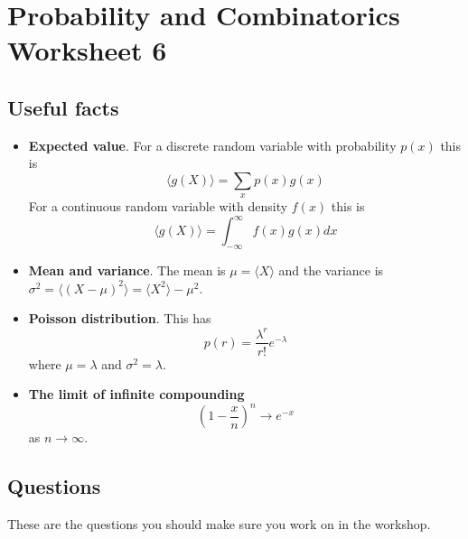 \documentclass[11pt,a4paper]{scrartcl}
\begin{document}
\section*{Probability and Combinatorics Worksheet 6}

\subsection*{Useful facts}

\begin{itemize}

\item \textbf{Expected value}. For a discrete random variable with probability $p(x)$ this is
\begin{equation}
\langle g(X) \rangle = \sum_x p(x)g(x)
\end{equation}
For a continuous random variable with density $f(x)$ this is
\begin{equation}
\langle g(X)\rangle = \int_{-\infty}^\infty{f(x)g(x)}dx
\end{equation}


\item \textbf{Mean and variance}. The mean is $\mu=\langle X\rangle$ and the variance is $\sigma^2=\langle(X-\mu)^2\rangle=\langle X^2\rangle - \mu^2$.

\item \textbf{Poisson distribution}. This has
\begin{equation}
p(r)=\frac{\lambda^r}{r!}e^{-\lambda}
\end{equation}
where $\mu=\lambda$ and $\sigma^2=\lambda$.

\item \textbf{The limit of infinite compounding}
  \begin{equation}
    \left(1-\frac{x}{n}\right)^n\rightarrow e^{-x}
  \end{equation}
  as $n\rightarrow\infty$.

  
\end{itemize}



\subsection*{Questions}

These are the questions you should make sure you work on in the workshop.
\end{document}
